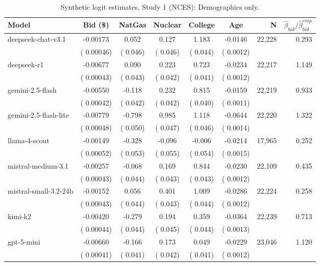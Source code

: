 \begin{table}[h]
\centering
\caption{Synthetic logit estimates, Study 1 (NCES): Demographics only.}
\label{tab:syn-logit-demonly}
\begin{threeparttable}
\footnotesize
\begin{tabular}{lcccccrr}
\toprule
Model & Bid (\$) & NatGas & Nuclear & College & Age & N & $\hat\beta_{bid}/\hat\beta_{bid}^{emp}$ \\
\midrule
deepseek-chat-v3.1 &  -0.00173 &   0.052 &   0.127 &   1.183 & -0.0146 &    22,228 &  0.293 \\
 & (  0.00046) & (  0.046) & (  0.046) & (  0.044) & ( 0.0012) & & \\
deepseek-r1 &  -0.00677 &   0.090 &   0.223 &   0.723 & -0.0234 &    22,217 &  1.149 \\
 & (  0.00043) & (  0.043) & (  0.042) & (  0.041) & ( 0.0012) & & \\
gemini-2.5-flash &  -0.00550 &  -0.118 &   0.232 &   0.815 & -0.0159 &    22,219 &  0.933 \\
 & (  0.00042) & (  0.042) & (  0.042) & (  0.040) & ( 0.0011) & & \\
gemini-2.5-flash-lite &  -0.00779 &  -0.798 &   0.985 &   1.118 & -0.0644 &    22,220 &  1.322 \\
 & (  0.00048) & (  0.050) & (  0.047) & (  0.046) & ( 0.0014) & & \\
llama-4-scout &  -0.00149 &  -0.328 &  -0.096 &  -0.006 & -0.0214 &    17,965 &  0.252 \\
 & (  0.00052) & (  0.053) & (  0.055) & (  0.054) & ( 0.0015) & & \\
mistral-medium-3.1 &  -0.00257 &  -0.068 &   0.169 &   0.844 & -0.0230 &    22,109 &  0.435 \\
 & (  0.00043) & (  0.044) & (  0.043) & (  0.043) & ( 0.0012) & & \\
mistral-small-3.2-24b &  -0.00152 &   0.056 &   0.401 &   1.009 & -0.0286 &    22,224 &  0.258 \\
 & (  0.00043) & (  0.044) & (  0.043) & (  0.044) & ( 0.0012) & & \\
kimi-k2 &  -0.00420 &  -0.279 &   0.194 &   0.359 & -0.0364 &    22,239 &  0.713 \\
 & (  0.00044) & (  0.044) & (  0.045) & (  0.044) & ( 0.0013) & & \\
gpt-5-mini &  -0.00660 &  -0.166 &   0.173 &   0.049 & -0.0229 &    23,046 &  1.120 \\
 & (  0.00041) & (  0.041) & (  0.042) & (  0.041) & ( 0.0012) & & \\

\end{tabular}
\end{threeparttable}
\end{table}
